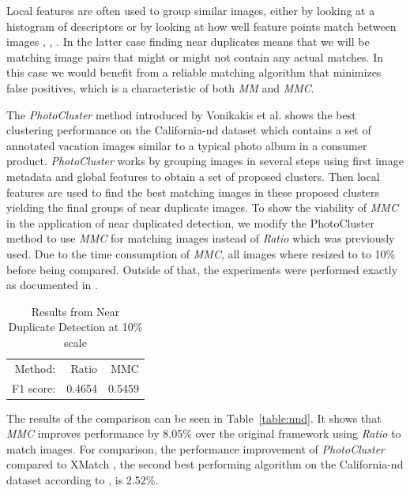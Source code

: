 \documentclass{article}
\begin{document}
Local features are often used to group similar images, either by looking
at a histogram of descriptors \cite{wu2009bundling} or by looking at how
well feature points match between images \cite{zhao2009scale},
\cite{chu2010consumer}, \cite{vas2013cluster}. In the latter case 
finding near duplicates means that we will be matching image pairs that 
might or might not contain any actual matches. In this case we would 
benefit from a reliable matching algorithm that minimizes false 
positives, which is a characteristic of both \emph{MM} and \emph{MMC}.

The \emph{PhotoCluster} method introduced by Vonikakis et al.  
\cite{vas2013cluster} shows the best clustering performance on the 
California-nd dataset \cite{jinda2012california} which contains a set of
annotated vacation images similar to a typical photo album in a consumer
product. \emph{PhotoCluster} works by grouping images in several steps 
using first image metadata and global features to obtain a set of 
proposed clusters. Then local features are used to find the best 
matching images in these proposed clusters yielding the final groups of 
near duplicate images. To show the viability of \emph{MMC} in the 
application of near duplicated detection, we modify the PhotoCluster 
method to use \emph{MMC} for matching images instead of \emph{Ratio} 
which was previously used. Due to the time consumption of \emph{MMC}, 
all images where resized to to 10\% before being compared. Outside of 
that, the experiments were performed exactly as documented in 
\cite{vas2013cluster}.

\begin{table}[htb]
\caption{Results from Near Duplicate Detection at 10\% scale}
\label{table:ndd}
	\centering
\begin{tabular}{r*{2}{r}}
\hline
    Method: & Ratio & MMC   \\
	\noalign{\smallskip}
    F1 score: & 0.4654 & 0.5459 \\
	\hline
\end{tabular}
\end{table}

The results of the comparison can be seen in Table~\ref{table:nnd}. It 
shows that \emph{MMC} improves performance by 8.05\% over the original 
framework using \emph{Ratio} to match images. For comparison, the 
performance improvement of \emph{PhotoCluster} compared to XMatch 
\cite{zhao2009scale}, the second best performing algorithm on the 
California-nd dataset according to \cite{vas2013cluster}, is 2.52\%.
\end{document}

